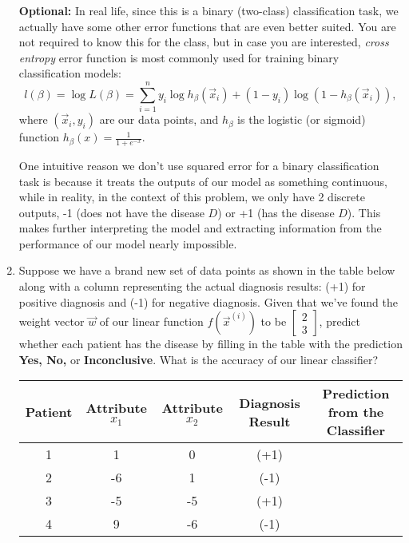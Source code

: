 \begin{enumerate}
{    \textbf{Optional: } In real life, since this is a binary (two-class) classification task, we actually have some other error functions that are even better suited. You are not required to know this for the class, but in case you are interested, \textit{cross entropy} error function is most commonly used for training binary classification models:
    $$
l(\beta)=\log L(\beta) =\sum_{i=1}^ny_i\log h_{\beta}(\vec{x}_i) + (1-y_i)\log (1-h_{\beta}(\vec{x}_i)),
$$
where $(\vec{x}_i, y_i)$ are our data points, and $h_{\beta}$ is the logistic (or sigmoid) function $h_{\beta}(x) = \frac{1}{1 + e^{-x}}$.

One intuitive reason we don't use squared error for a binary classification task is because it treats the outputs of our model as something continuous, while in reality, in the context of this problem, we only have 2 discrete outputs, -1 (does not have the disease $D$) or +1 (has the disease $D$). This makes further interpreting the model and extracting information from the performance of our model nearly impossible.
}
    
        \item Suppose we have a brand new set of data points as shown in the table below along with a column representing the actual diagnosis results: (+1) for positive diagnosis and (-1) for negative diagnosis. Given that we've found the weight vector $\vec{w}$ of our linear function $f(\vec{x}^{(i)})$ to be $\begin{bmatrix}
            2\\ 
            3
            \end{bmatrix}$, predict whether each patient has the disease by filling in the table with the prediction \textbf{Yes, No, } or \textbf{Inconclusive}. What is the accuracy of our linear classifier?
        \begin{table}[h]
        \centering
\begin{tabular}{|c|c|c|c|c|}
\hline
Patient & Attribute $x_1$ & Attribute $x_2$ & Diagnosis Result & Prediction from the Classifier \\ \hline
1       & 1               & 0               & (+1)             &                                \\ \hline
2       & -6              & 1               & (-1)             &                                \\ \hline
3       & -5              & -5              & (+1)             &                                \\ \hline
4       & 9               & -6              & (-1)             &                                \\ \hline
\end{tabular}
\end{table}


\end{enumerate}
